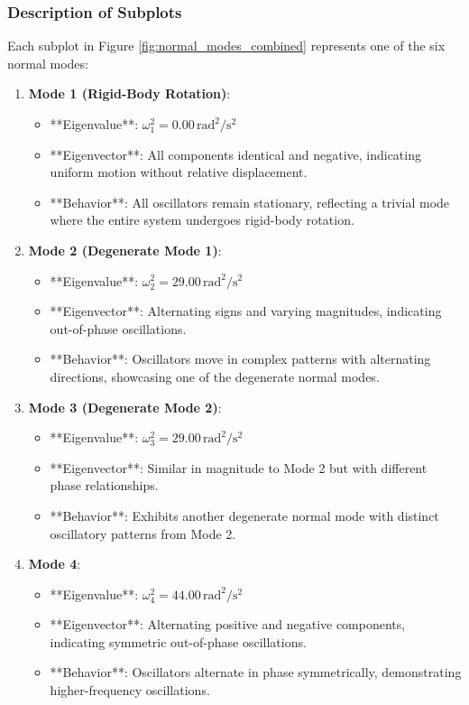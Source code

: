 \documentclass[12pt]{report} %
\begin{document}
\subsubsection{Description of Subplots}
\label{subsubsec:part2_task3_subplot_description}

Each subplot in Figure \ref{fig:normal_modes_combined} represents one of the six normal modes:

\begin{enumerate}
    \item \textbf{Mode 1 (Rigid-Body Rotation)}:
    \begin{itemize}
        \item **Eigenvalue**: \( \omega_1^2 = 0.00 \, \text{rad}^2/\text{s}^2 \)
        \item **Eigenvector**: All components identical and negative, indicating uniform motion without relative displacement.
        \item **Behavior**: All oscillators remain stationary, reflecting a trivial mode where the entire system undergoes rigid-body rotation.
    \end{itemize}
    
    \item \textbf{Mode 2 (Degenerate Mode 1)}:
    \begin{itemize}
        \item **Eigenvalue**: \( \omega_2^2 = 29.00 \, \text{rad}^2/\text{s}^2 \)
        \item **Eigenvector**: Alternating signs and varying magnitudes, indicating out-of-phase oscillations.
        \item **Behavior**: Oscillators move in complex patterns with alternating directions, showcasing one of the degenerate normal modes.
    \end{itemize}
    
    \item \textbf{Mode 3 (Degenerate Mode 2)}:
    \begin{itemize}
        \item **Eigenvalue**: \( \omega_3^2 = 29.00 \, \text{rad}^2/\text{s}^2 \)
        \item **Eigenvector**: Similar in magnitude to Mode 2 but with different phase relationships.
        \item **Behavior**: Exhibits another degenerate normal mode with distinct oscillatory patterns from Mode 2.
    \end{itemize}
    
    \item \textbf{Mode 4}:
    \begin{itemize}
        \item **Eigenvalue**: \( \omega_4^2 = 44.00 \, \text{rad}^2/\text{s}^2 \)
        \item **Eigenvector**: Alternating positive and negative components, indicating symmetric out-of-phase oscillations.
        \item **Behavior**: Oscillators alternate in phase symmetrically, demonstrating higher-frequency oscillations.
    \end{itemize}
    

\end{enumerate}
\end{document}
